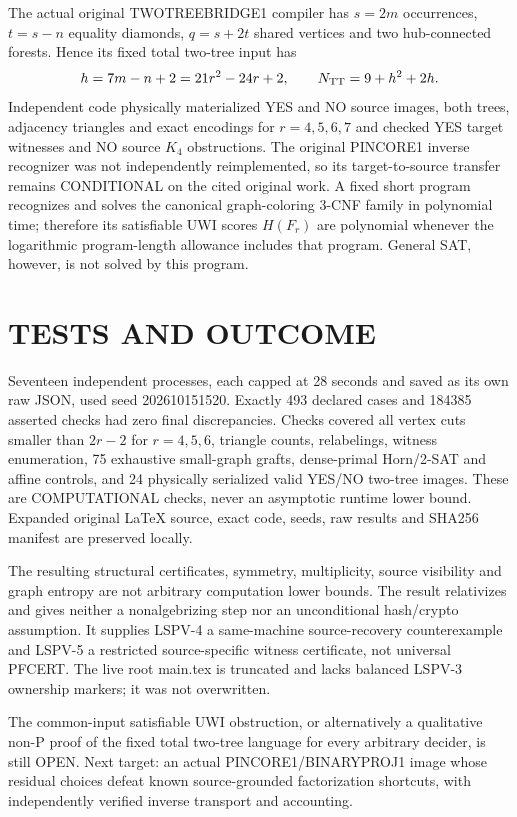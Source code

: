 \documentclass{article}
\begin{document}
The actual original TWOTREEBRIDGE1 compiler has $s=2m$ occurrences, $t=s-n$ equality diamonds, $q=s+2t$ shared vertices and two hub-connected forests. Hence its fixed total two-tree input has
\[
h=7m-n+2=21r^2-24r+2,\qquad N_{\rm TT}=9+h^2+2h.
\]
Independent code physically materialized YES and NO source images, both trees, adjacency triangles and exact encodings for $r=4,5,6,7$ and checked YES target witnesses and NO source $K_4$ obstructions. The original PINCORE1 inverse recognizer was not independently reimplemented, so its target-to-source transfer remains CONDITIONAL on the cited original work. A fixed short program recognizes and solves the canonical graph-coloring 3-CNF family in polynomial time; therefore its satisfiable UWI scores $H(F_r)$ are polynomial whenever the logarithmic program-length allowance includes that program. General SAT, however, is not solved by this program.

\section{TESTS AND OUTCOME}
Seventeen independent processes, each capped at 28 seconds and saved as its own raw JSON, used seed 202610151520. Exactly 493 declared cases and 184385 asserted checks had zero final discrepancies. Checks covered all vertex cuts smaller than $2r-2$ for $r=4,5,6$, triangle counts, relabelings, witness enumeration, 75 exhaustive small-graph grafts, dense-primal Horn/2-SAT and affine controls, and 24 physically serialized valid YES/NO two-tree images. These are COMPUTATIONAL checks, never an asymptotic runtime lower bound. Expanded original LaTeX source, exact code, seeds, raw results and SHA256 manifest are preserved locally.

The resulting structural certificates, symmetry, multiplicity, source visibility and graph entropy are not arbitrary computation lower bounds. The result relativizes and gives neither a nonalgebrizing step nor an unconditional hash/crypto assumption. It supplies LSPV-4 a same-machine source-recovery counterexample and LSPV-5 a restricted source-specific witness certificate, not universal PFCERT. The live root main.tex is truncated and lacks balanced LSPV-3 ownership markers; it was not overwritten.

The common-input satisfiable UWI obstruction, or alternatively a qualitative non-P proof of the fixed total two-tree language for every arbitrary decider, is still OPEN. Next target: an actual PINCORE1/BINARYPROJ1 image whose residual choices defeat known source-grounded factorization shortcuts, with independently verified inverse transport and accounting.
\end{document}
